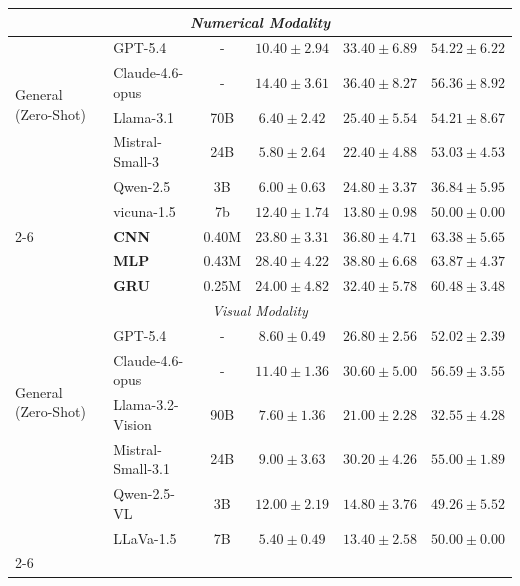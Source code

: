 \begin{table}[t]
\begin{tabular}{@{} l l c c c c @{}}
        \multicolumn{6}{c}{\textit{Numerical Modality}} \\
        \midrule
        
        \multirow{4}{*}{General (Zero-Shot)} 
        &  GPT-5.4 & - & $10.40 \pm 2.94$ & $33.40 \pm 6.89$ & $54.22 \pm 6.22$ \\
        & Claude-4.6-opus & - & $14.40 \pm 3.61$ & $36.40 \pm 8.27$ & $56.36 \pm 8.92$  \\
        & Llama-3.1  & 70B & $6.40 \pm 2.42$ & $25.40 \pm 5.54$ & $54.21 \pm 8.67$ \\
        & Mistral-Small-3 & 24B & $5.80 \pm 2.64$ & $22.40 \pm 4.88$ & $53.03 \pm 4.53$ \\
        & Qwen-2.5  & 3B & $6.00 \pm 0.63$ & $24.80 \pm 3.37$ & $36.84 \pm 5.95$ \\
        & vicuna-1.5  & 7b & $12.40 \pm 1.74$ & $13.80 \pm 0.98$ & $50.00 \pm 0.00$ \\
        \cmidrule(l){2-6} 
        
        \multirow{2}{*}{Lightweight (Ours)} 
        & \textbf{CNN} & 0.40M & \textbf{$23.80 \pm 3.31$} & \textbf{$ 36.80 \pm 4.71$} & \textbf{$63.38 \pm 5.65$} \\
        & \textbf{MLP} & 0.43M & \textit{$28.40 \pm 4.22$} & \textit{$38.80 \pm 6.68$} & \textit{$63.87 \pm 4.37$} \\
        & \textbf{GRU} & 0.25M & \textit{$24.00 \pm 4.82$} & \textit{$32.40 \pm 5.78$} & \textit{$60.48 \pm 3.48$} \\
        \midrule
        
        \multicolumn{6}{c}{\textit{Visual Modality}} \\
        \midrule
        
        \multirow{4}{*}{General (Zero-Shot)} 
        &  GPT-5.4 & - & $8.60 \pm 0.49$ & $26.80 \pm 2.56$ & $52.02 \pm 2.39$ \\
        & Claude-4.6-opus & - & $11.40 \pm 1.36$ & $30.60 \pm 5.00$ & $56.59 \pm 3.55$ \\
        &  Llama-3.2-Vision & 90B &  $7.60 \pm 1.36$ & $21.00 \pm 2.28$ & $32.55 \pm 4.28$  \\
        & Mistral-Small-3.1 & 24B & $9.00 \pm 3.63$ & $30.20 \pm 4.26$ & $55.00 \pm 1.89$ \\
        & Qwen-2.5-VL  & 3B & $12.00 \pm 2.19$ & $14.80 \pm 3.76$ & $49.26 \pm 5.52$ \\
        & LLaVa-1.5  & 7B & $5.40 \pm 0.49$ & $13.40 \pm 2.58$ & $50.00 \pm 0.00$  \\
        \cmidrule(l){2-6}
        

\end{tabular}
\end{table}
